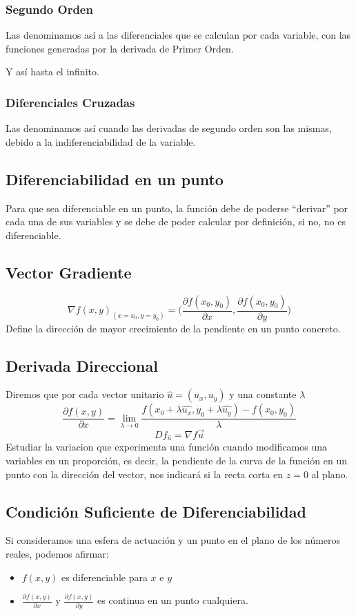 \subsubsection{Segundo Orden}
 Las denominamos así a las diferenciales que se calculan por cada variable, con las funciones generadas por la derivada de Primer Orden. \par Y así hasta el infinito.
\subsubsection{Diferenciales Cruzadas}
 Las denominamos así cuando las derivadas de segundo orden son las mismas, debido a la indiferenciabilidad de la variable.
\subsection{Diferenciabilidad en un punto}
 Para que sea diferenciable en un punto, la función debe de poderse ``derivar'' por cada una de sus variables y se debe de poder calcular por definición, si no, no es diferenciable.
\subsection{Vector Gradiente}
\[
        \boxed{\nabla f(x,y)_{{(x=x_0, y=y_0)}} = \Big(\frac{\partial f(x_0,y_0)}{\partial x},\frac{\partial f(x_0,y_0)}{\partial y}\Big)}
\]
 Define la dirección de mayor crecimiento de la pendiente en un punto concreto.
\subsection{Derivada Direccional}
 Diremos que por cada vector unitario \(\hat{u} = (u_x,u_y)\) y una constante \(\lambda\)
\[
        \frac{\partial f(x,y)}{\partial x} = \lim_{\lambda\rightarrow 0} \frac{f(x_0+\lambda \hat{u_x}, y_0 + \lambda \hat{u_y})-f(x_0,y_0)}{\lambda}
\]
\[
        Df_{\hat{u}} = \nabla f \vec{u}
\]
 Estudiar la variacion que experimenta una función cuando modificamos una variables en un proporción, es decir, la pendiente de la curva de la función en un punto con la dirección del vector, nos indicará si la recta corta en \(z=0\) al plano.
\subsection{Condición Suficiente de Diferenciabilidad}
 Si consideramos una esfera de actuación y un punto en el plano de los números reales, podemos afirmar:
\begin{itemize}
        \item \(f(x,y)\) es diferenciable para \(x\) e \(y\)
        \item \(\frac{\partial f(x,y)}{\partial x} \) y \(\frac{\partial f(x,y)}{\partial y} \) es continua en un punto cualquiera.
\end{itemize}

